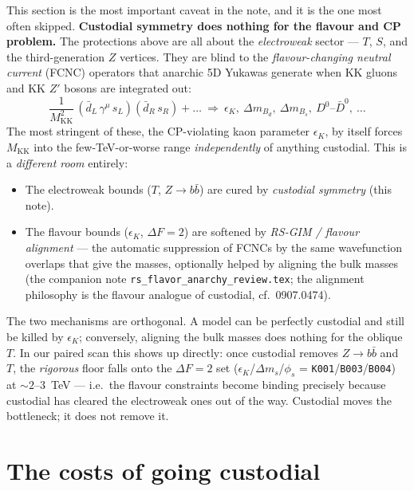 \documentclass[11pt]{article}
\newcommand{\MKK}{M_{\mathrm{KK}}}
\newcommand{\code}[1]{\texttt{#1}}
\theoremstyle{definition}
\begin{document}
This section is the most important caveat in the note, and it is the one most
often skipped. \textbf{Custodial symmetry does nothing for the flavour and CP
problem.} The protections above are all about the \emph{electroweak} sector ---
$T$, $S$, and the third-generation $Z$ vertices. They are blind to the
\emph{flavour-changing neutral current} (FCNC) operators that anarchic 5D Yukawas
generate when KK gluons and KK $Z'$ bosons are integrated out:
\begin{equation}
\frac{1}{\MKK^2}\,(\bar d_L\,\gamma^\mu\,s_L)(\bar d_R\,s_R) + \dots
\ \Longrightarrow\ \epsilon_K,\ \Delta m_{B_d},\ \Delta m_{B_s},\ D^0\text{--}\bar D^0,\ \dots
\end{equation}
The most stringent of these, the CP-violating kaon parameter $\epsilon_K$, by
itself forces $\MKK$ into the few-TeV-or-worse range \emph{independently} of
anything custodial. This is a \emph{different room} entirely:
\begin{itemize}[leftmargin=1.4em]
\item The electroweak bounds ($T$, $Z\to b\bar b$) are cured by
\emph{custodial symmetry} (this note).
\item The flavour bounds ($\epsilon_K$, $\Delta F=2$) are softened by
\emph{RS-GIM / flavour alignment} --- the automatic suppression of FCNCs by the
same wavefunction overlaps that give the masses, optionally helped by aligning the
bulk masses (the companion note \code{rs\_flavor\_anarchy\_review.tex}; the
alignment philosophy is the flavour analogue of custodial, cf.\ 0907.0474).
\end{itemize}
The two mechanisms are orthogonal. A model can be perfectly custodial and still be
killed by $\epsilon_K$; conversely, aligning the bulk masses does nothing for the
oblique $T$. In our paired scan this shows up directly: once custodial removes
$Z\to b\bar b$ and $T$, the \emph{rigorous} floor falls onto the $\Delta F=2$ set
($\epsilon_K$/$\Delta m_s$/$\phi_s$ = \code{K001}/\code{B003}/\code{B004}) at
$\sim 2$--$3$~TeV --- i.e.\ the flavour constraints become binding precisely
because custodial has cleared the electroweak ones out of the way. Custodial moves
the bottleneck; it does not remove it.

\section{The costs of going custodial}
\label{sec:costs}
\end{document}
